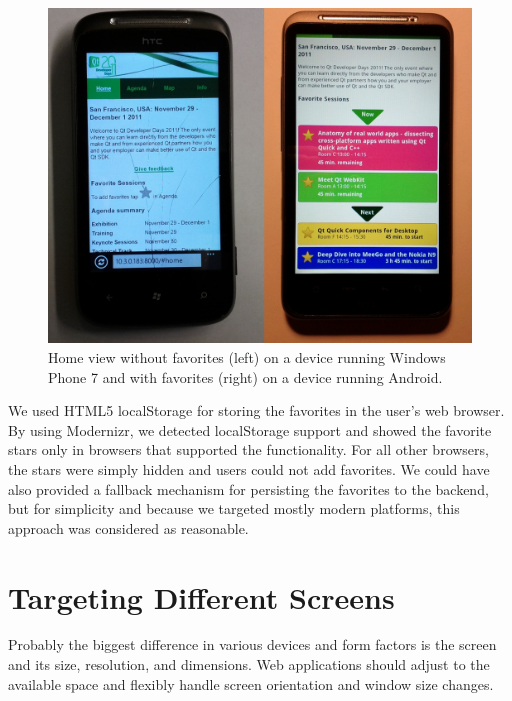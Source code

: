 \begin{figure}[ht]
  \begin{center}
    \includegraphics[width=\textwidth]{images/android-home.jpg}
    \caption{Home view without favorites (left) on a device running
      Windows Phone 7 and with favorites (right) on a device running
      Android.}
    \label{figure:android-home-favorites.jpg}
  \end{center}
\end{figure}

We used HTML5 localStorage for storing the favorites in the user's web
browser. By using Modernizr, we detected localStorage support and
showed the favorite stars only in browsers that supported the
functionality. For all other browsers, the stars were simply hidden
and users could not add favorites. We could have also provided a
fallback mechanism for persisting the favorites to the backend, but
for simplicity and because we targeted mostly modern platforms, this
approach was considered as reasonable.

\section{Targeting Different Screens}
\label{section:targeting-screens}

Probably the biggest difference in various devices and form factors is
the screen and its size, resolution, and dimensions. Web applications
should adjust to the available space and flexibly handle screen
orientation and window size changes.

